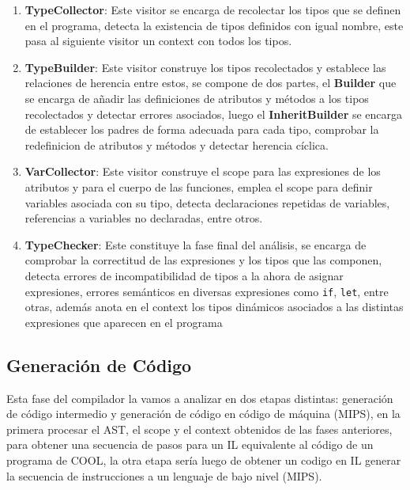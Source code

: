 \documentclass{article}
\begin{document}
\begin{enumerate}
	\item[] \textbf{TypeCollector}: Este visitor se encarga de recolectar los tipos que se definen en el programa, detecta la existencia de tipos definidos con igual nombre, este pasa al siguiente visitor un context con todos los tipos.
	
	\item[] \textbf{TypeBuilder}: Este visitor construye los tipos recolectados y establece las relaciones de herencia entre estos, se compone de dos partes, el \textbf{Builder} que se encarga de a\~nadir las definiciones de atributos y m\'etodos a los tipos recolectados y detectar errores asociados, luego el \textbf{InheritBuilder} se encarga de establecer los padres de forma adecuada para cada tipo, comprobar la redefinicion de atributos y m\'etodos y detectar herencia c\'iclica. 
	
	\item[] \textbf{VarCollector}: Este visitor construye el scope para las expresiones de los atributos y para el cuerpo de las funciones, emplea el scope para definir variables asociada con su tipo, detecta declaraciones repetidas de variables, referencias a variables no declaradas, entre otros.
	
	\item[] \textbf{TypeChecker}: Este constituye la fase final del an\'alisis, se encarga de comprobar la correctitud de las expresiones y los tipos que las componen, detecta errores de incompatibilidad de tipos a la ahora de asignar expresiones, errores sem\'anticos en diversas expresiones como \verb|if|, \verb|let|, entre otras, adem\'as anota en el context los tipos din\'amicos asociados a las distintas expresiones que aparecen en el programa
\end{enumerate}

\subsection{Generaci\'on de C\'odigo}

Esta fase del compilador la vamos a analizar en dos etapas distintas: generaci\'on de c\'odigo
intermedio y generaci\'on de c\'odigo en c\'odigo de m\'aquina (MIPS), en la primera procesar el AST, el
scope y el context obtenidos de las fases anteriores, para obtener una secuencia de pasos para un IL
equivalente al código de un programa de COOL, la otra etapa sería luego de obtener un codigo en
IL generar la secuencia de instrucciones a un lenguaje de bajo nivel (MIPS).
\end{document}
